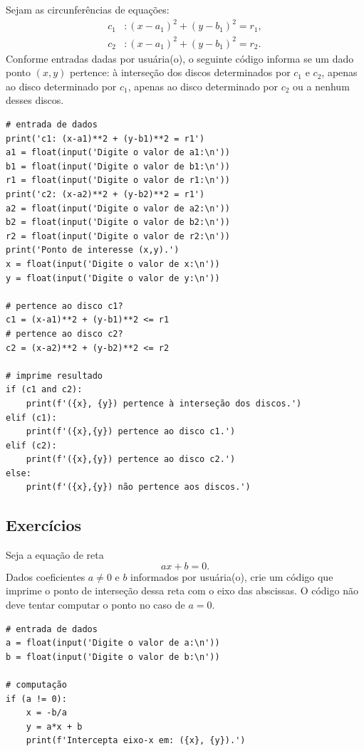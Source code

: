 \begin{ex}
  Sejam as circunferências de equações:
  \begin{align}
    c_1&: (x-a_1)^2 + (y-b_1)^2 = r_1,\\
    c_2&: (x-a_1)^2 + (y-b_1)^2 = r_2.
  \end{align}
  Conforme entradas dadas por usuária(o), o seguinte código informa se um dado ponto $(x, y)$ pertence: à interseção dos discos determinados por $c_1$ e $c_2$, apenas ao disco determinado por $c_1$, apenas ao disco determinado por $c_2$ ou a nenhum desses discos.

\begin{lstlisting}
# entrada de dados
print('c1: (x-a1)**2 + (y-b1)**2 = r1')
a1 = float(input('Digite o valor de a1:\n'))
b1 = float(input('Digite o valor de b1:\n'))
r1 = float(input('Digite o valor de r1:\n'))
print('c2: (x-a2)**2 + (y-b2)**2 = r1')
a2 = float(input('Digite o valor de a2:\n'))
b2 = float(input('Digite o valor de b2:\n'))
r2 = float(input('Digite o valor de r2:\n'))
print('Ponto de interesse (x,y).')
x = float(input('Digite o valor de x:\n'))
y = float(input('Digite o valor de y:\n'))

# pertence ao disco c1?
c1 = (x-a1)**2 + (y-b1)**2 <= r1
# pertence ao disco c2?
c2 = (x-a2)**2 + (y-b2)**2 <= r2

# imprime resultado
if (c1 and c2):
    print(f'({x}, {y}) pertence à interseção dos discos.')
elif (c1):
    print(f'({x},{y}) pertence ao disco c1.')
elif (c2):
    print(f'({x},{y}) pertence ao disco c2.')
else:
    print(f'({x},{y}) não pertence aos discos.')
\end{lstlisting}

\end{ex}


\subsection{Exercícios}

\begin{exer}
  Seja a equação de reta
  \begin{equation}
    ax + b = 0.
  \end{equation}
  Dados coeficientes $a \neq 0$ e $b$ informados por usuária(o), crie um código que imprime o ponto de interseção dessa reta com o eixo das abscissas. O código não deve tentar computar o ponto no caso de $a=0$. 
\end{exer}
\begin{resp}

\begin{lstlisting}
# entrada de dados
a = float(input('Digite o valor de a:\n'))
b = float(input('Digite o valor de b:\n'))

# computação
if (a != 0):
    x = -b/a
    y = a*x + b
    print(f'Intercepta eixo-x em: ({x}, {y}).')
\end{lstlisting}

\end{resp}

